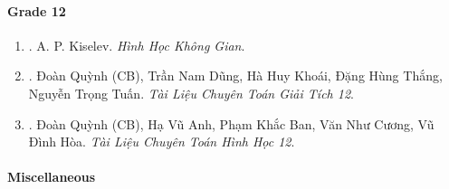 \documentclass{article}
\begin{document}
\paragraph{Grade 12}

\begin{enumerate}
	\item \cite{Kiselev_hhkg}. A. P. Kiselev. {\it Hình Học Không Gian}.\hfill{\sf[reading]}
	
	\item \cite{TLCT_giai_tich_12}. Đoàn Quỳnh (CB), Trần Nam Dũng, Hà Huy Khoái, Đặng Hùng Thắng, Nguyễn Trọng Tuấn. {\it Tài Liệu Chuyên Toán Giải Tích 12}.\hfill{\sf[reading]}
	
	\item \cite{TLCT_hinh_hoc_12}. Đoàn Quỳnh (CB), Hạ Vũ Anh, Phạm Khắc Ban, Văn Như Cương, Vũ Đình Hòa. {\it Tài Liệu Chuyên Toán Hình Học 12}.\hfill{\sf[reading]}
\end{enumerate}

\paragraph{Miscellaneous}
\end{document}
